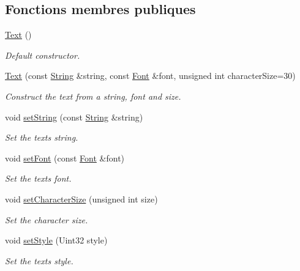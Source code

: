 \subsection*{Fonctions membres publiques}
\begin{DoxyCompactItemize}
\item 
\hyperlink{classsf_1_1Text_aff7cab6a92e5948c9d1481cb2d87eb84}{Text} ()
\begin{DoxyCompactList}\small\item\em Default constructor. \end{DoxyCompactList}\item 
\hyperlink{classsf_1_1Text_a614019e0b5c0ed39a99d32483a51f2c5}{Text} (const \hyperlink{classsf_1_1String}{String} \&string, const \hyperlink{classsf_1_1Font}{Font} \&font, unsigned int character\+Size=30)
\begin{DoxyCompactList}\small\item\em Construct the text from a string, font and size. \end{DoxyCompactList}\item 
void \hyperlink{classsf_1_1Text_a7d3b3359f286fd9503d1ced25b7b6c33}{set\+String} (const \hyperlink{classsf_1_1String}{String} \&string)
\begin{DoxyCompactList}\small\item\em Set the text\textquotesingle{}s string. \end{DoxyCompactList}\item 
void \hyperlink{classsf_1_1Text_a2927805d1ae92d57f15034ea34756b81}{set\+Font} (const \hyperlink{classsf_1_1Font}{Font} \&font)
\begin{DoxyCompactList}\small\item\em Set the text\textquotesingle{}s font. \end{DoxyCompactList}\item 
void \hyperlink{classsf_1_1Text_ae96f835fc1bff858f8a23c5b01eaaf7e}{set\+Character\+Size} (unsigned int size)
\begin{DoxyCompactList}\small\item\em Set the character size. \end{DoxyCompactList}\item 
void \hyperlink{classsf_1_1Text_ad791702bc2d1b6590a1719aa60635edf}{set\+Style} (Uint32 style)
\begin{DoxyCompactList}\small\item\em Set the text\textquotesingle{}s style. \end{DoxyCompactList}\item 

\end{DoxyCompactItemize}
